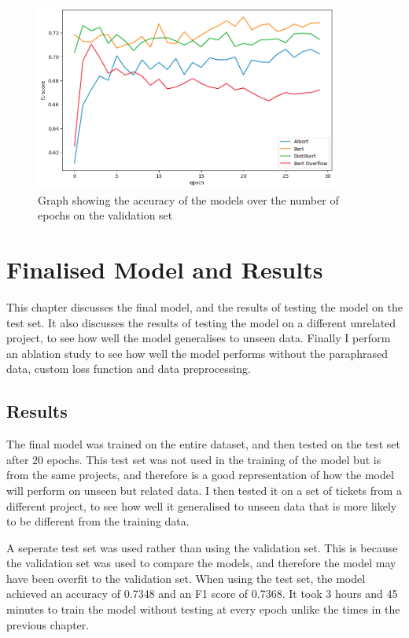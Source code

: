 \documentclass{UoYCSproject}
\begin{document}
\begin{figure}[h]
    \centering

        \includegraphics[width=10cm]{./figures/accurach-epochs}
        \caption{Graph showing the accuracy of the models over the number of epochs on the validation set}
        \label{fig:accuracy-graph}
    \end{figure}

    \chapter{Finalised Model and Results }
    \label{ch:results}

    This chapter discusses the final model, and the results of testing the model on the test set.
    It also discusses the results of testing the model on a different unrelated project, to see how well the model generalises to unseen data.
    Finally I perform an ablation study to see how well the model performs without the paraphrased data, custom loss function and data preprocessing.


    \section{Results}\label{sec:results}
    The final model was trained on the entire dataset, and then tested on the test set after 20 epochs.
    This test set was not used in the training of the model but is from the same projects, and therefore is a good representation of how the model will perform on unseen but related data.
    I then tested it on a set of tickets from a different project, to see how well it generalised to unseen data that is more likely to be different from the training data.

    A seperate test set was used rather than using the validation set.
    This is because the validation set was used to compare the models, and therefore the model may have been overfit to the validation set.
    When using the test set, the model achieved an accuracy of 0.7348 and an F1 score of 0.7368.
    It took 3 hours and 45 minutes to train the model without testing at every epoch unlike the times in the previous chapter.
\end{document}
